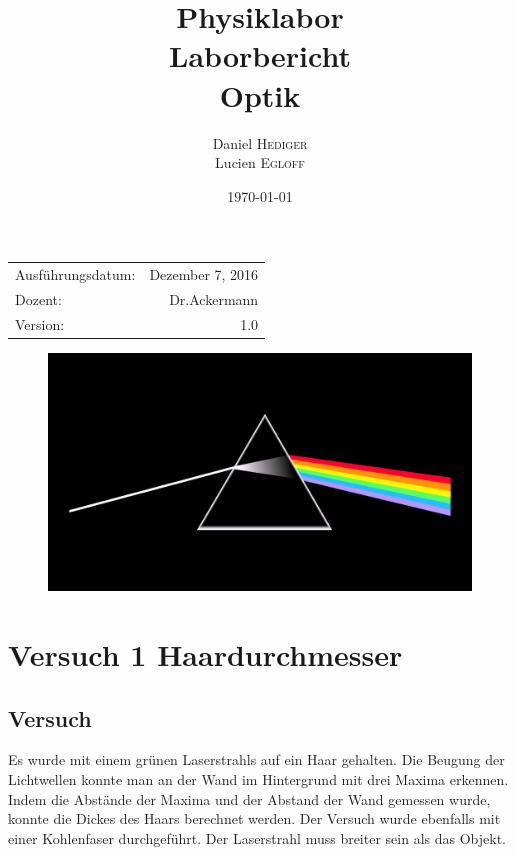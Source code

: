 \documentclass{article}
\title{Physiklabor \\ Laborbericht \\ Optik} %
\author{Daniel \textsc{Hediger} \\ Lucien \textsc{Egloff}} %
\date{\today} %
\begin{document}
\maketitle %

\begin{center}
\begin{tabular}{l r}
	Ausführungsdatum: & Dezember 7, 2016 \\ %
	Dozent: & Dr.Ackermann \\%
	Version: & 1.0
	
\end{tabular}
\end{center}
\begin{figure}[H]
	\centering
	\includegraphics[scale=0.2]{dsotm.jpg} 
\end{figure}
\newpage
\tableofcontents 

\newpage
\section{Versuch 1 Haardurchmesser}
\subsection{Versuch}
Es wurde mit einem grünen Laserstrahls auf ein Haar gehalten. Die Beugung der Lichtwellen konnte
man an der Wand im Hintergrund mit drei Maxima erkennen. Indem die Abstände der Maxima und
der Abstand der Wand gemessen wurde, konnte die Dickes des Haars berechnet werden. Der Versuch
wurde ebenfalls mit einer Kohlenfaser durchgeführt. Der Laserstrahl muss breiter sein als das
Objekt.
\end{document}

